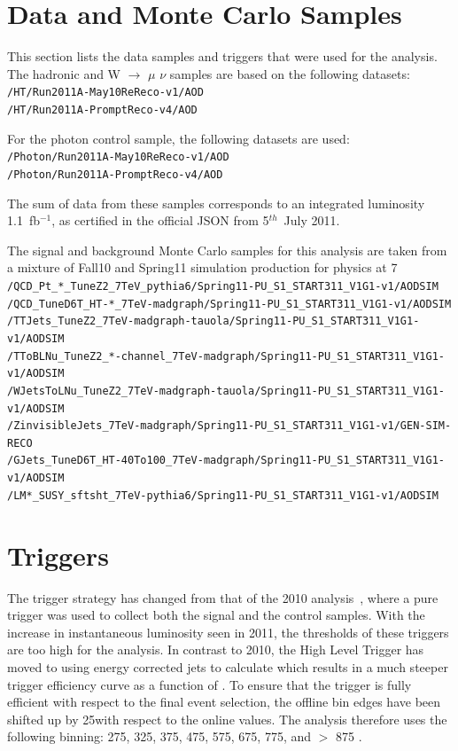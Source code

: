 \section{Data and Monte Carlo Samples \label{sec:datasamples}}
This section lists the data samples and triggers that were used for the
analysis. The hadronic and W $\rightarrow$ $\mu$ $\nu$ samples are
based on the following datasets:\\
\verb!/HT/Run2011A-May10ReReco-v1/AOD! \\
\verb!/HT/Run2011A-PromptReco-v4/AOD!

For the photon control sample, the following datasets are used:\\
\verb!/Photon/Run2011A-May10ReReco-v1/AOD! \\
\verb!/Photon/Run2011A-PromptReco-v4/AOD!

The sum of data from these samples corresponds to an integrated
luminosity 1.1~fb$^{-1}$, as certified in the official JSON from 
5$^{th}$~July 2011.

The signal and background Monte Carlo samples for this analysis are
taken from a mixture of Fall10 and Spring11 simulation production for
physics at 7\TeV \\
\verb!/QCD_Pt_*_TuneZ2_7TeV_pythia6/Spring11-PU_S1_START311_V1G1-v1/AODSIM!\\
\verb!/QCD_TuneD6T_HT-*_7TeV-madgraph/Spring11-PU_S1_START311_V1G1-v1/AODSIM!\\
\verb!/TTJets_TuneZ2_7TeV-madgraph-tauola/Spring11-PU_S1_START311_V1G1-v1/AODSIM!\\
\verb!/TToBLNu_TuneZ2_*-channel_7TeV-madgraph/Spring11-PU_S1_START311_V1G1-v1/AODSIM!\\
\verb!/WJetsToLNu_TuneZ2_7TeV-madgraph-tauola/Spring11-PU_S1_START311_V1G1-v1/AODSIM!\\
\verb!/ZinvisibleJets_7TeV-madgraph/Spring11-PU_S1_START311_V1G1-v1/GEN-SIM-RECO!\\
\verb!/GJets_TuneD6T_HT-40To100_7TeV-madgraph/Spring11-PU_S1_START311_V1G1-v1/AODSIM!\\
\verb!/LM*_SUSY_sftsht_7TeV-pythia6/Spring11-PU_S1_START311_V1G1-v1/AODSIM!

\section{Triggers} %
\label{sub:triggers}

The trigger strategy has changed from that of the 2010
analysis~\cite{RA1Paper}, where a pure \HT trigger was used to collect
both the signal and the control samples.  With the increase in
instantaneous luminosity seen in 2011, the \HT thresholds of these
triggers are too high for the analysis.  In contrast to 2010, the High
Level Trigger has moved to using energy corrected jets to calculate
\HT which results in a much steeper trigger efficiency curve as a
function of \HT.  To ensure that the trigger is fully efficient with
respect to the final event selection, the offline \HT bin edges have
been shifted up by 25\GeV with respect to the online values. The
analysis therefore uses the following \HT binning: 275, 325, 375, 475,
575, 675, 775, and $>$ 875 \gev.

